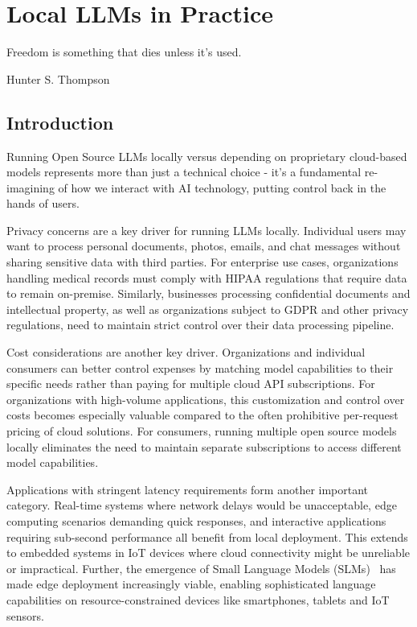 \setchapterpreamble[u]{\margintoc}
\chapter{Local LLMs in Practice}
\label{chapter:local}

\epigraph{Freedom is something that dies unless it's used.}{Hunter S. Thompson}

\section{Introduction}

Running Open Source LLMs locally versus depending on proprietary cloud-based models represents more than just a technical choice - it's a fundamental re-imagining of how we interact with AI technology, putting control back in the hands of users.

Privacy concerns are a key driver for running LLMs locally. Individual users may want to process personal documents, photos, emails, and chat messages without sharing sensitive data with third parties. For enterprise use cases, organizations handling medical records must comply with HIPAA regulations that require data to remain on-premise. Similarly, businesses processing confidential documents and intellectual property, as well as organizations subject to GDPR and other privacy regulations, need to maintain strict control over their data processing pipeline.

Cost considerations are another key driver. Organizations and individual consumers can better control expenses by matching model capabilities to their specific needs rather than paying for multiple cloud API subscriptions. For organizations with high-volume applications, this customization and control over costs becomes especially valuable compared to the often prohibitive per-request pricing of cloud solutions. For consumers, running multiple open source models locally eliminates the need to maintain separate subscriptions to access different model capabilities.

Applications with stringent latency requirements form another important category. Real-time systems where network delays would be unacceptable, edge computing scenarios demanding quick responses, and interactive applications requiring sub-second performance all benefit from local deployment. This extends to embedded systems in IoT devices where cloud connectivity might be unreliable or impractical. Further, the emergence of Small Language Models (SLMs)~ has made edge deployment increasingly viable, enabling sophisticated language capabilities on resource-constrained devices like smartphones, tablets and IoT sensors. 

